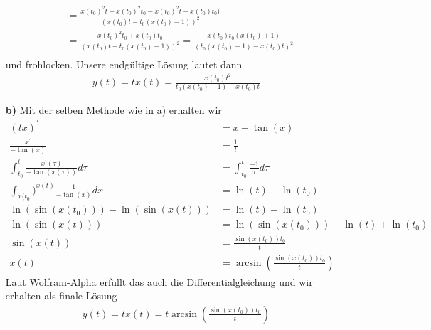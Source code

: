 \begin{solution}
\begin{itemize}
\begin{align*}
    &= \frac{x(t_0)^2t + x(t_0)^2t_0 - x(t_0)^2t + x(t_0)t_0)}{(x(t_0)t - t_0(x(t_0) - 1))^2}\\
    &= \frac{x(t_0)^2t_0 + x(t_0)t_0}{(x(t_0)t - t_0(x(t_0) - 1))^2}
    = \frac{x(t_0)t_0(x(t_0) + 1)}{(t_0(x(t_0) + 1) - x(t_0)t)^2}\\
  \end{align*}
  und frohlocken.
  Unsere endgültige Lösung lautet dann
  \begin{align*}
    y(t) = tx(t) = \frac{x(t_0)t^2}{t_0(x(t_0) + 1) - x(t_0)t}
  \end{align*}
  \item [\textbf{b)}]
  Mit der selben Methode wie in a) erhalten wir
  \begin{align*}
    (tx)^{\prime} &= x - \tan(x) \\
    \frac{x^{\prime}}{-\tan(x)} &= \frac{1}{t} \\
    \int_{t_0}^t \frac{x^{\prime}(\tau)}{-\tan(x(\tau))}d\tau &= \int_{t_0}^t \frac{-1}{\tau}d\tau \\
    \int_{x(t_0})^{x(t)} \frac{1}{-\tan(x)}dx &= \ln(t) - \ln(t_0) \\
    \ln(\sin(x(t_0))) - \ln(\sin(x(t))) &= \ln(t) - \ln(t_0) \\
    \ln(\sin(x(t))) &= \ln(\sin(x(t_0))) - \ln(t) + \ln(t_0) \\
    \sin(x(t)) &= \frac{\sin(x(t_0))t_0}{t} \\
    x(t) &= \arcsin\left(\frac{\sin(x(t_0))t_0}{t}\right)
  \end{align*}
Laut Wolfram-Alpha erfüllt das auch die Differentialgleichung und wir erhalten als finale Lösung
\begin{align*}
  y(t) = tx(t) = t\arcsin\left(\frac{\sin(x(t_0))t_0}{t}\right)
\end{align*}
\end{itemize}
\end{solution}
